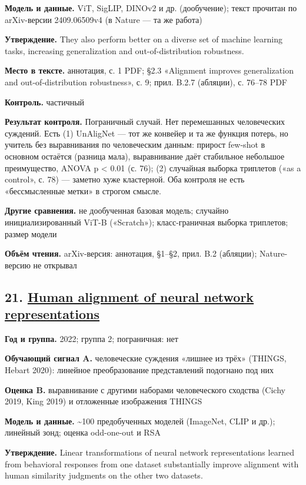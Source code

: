 \textbf{Модель и данные.} ViT, SigLIP, DINOv2 и др. (дообучение); текст прочитан по arXiv-версии 2409.06509v4 (в Nature — та же работа)

\textbf{Утверждение.} They also perform better on a diverse set of machine learning tasks, increasing generalization and out-of-distribution robustness.

\textbf{Место в тексте.} аннотация, с. 1 PDF; §2.3 «Alignment improves generalization and out-of-distribution robustness», с. 9; прил. B.2.7 (абляции), с. 76–78 PDF

\textbf{Контроль.} частичный

\textbf{Результат контроля.} Пограничный случай. Нет перемешанных человеческих суждений. Есть (1) UnAligNet — тот же конвейер и та же функция потерь, но учитель без выравнивания по человеческим данным: прирост few-shot в основном остаётся (разница мала), выравнивание даёт стабильное небольшое преимущество, ANOVA p < 0.01 (с. 76); (2) случайная выборка триплетов («as a control», с. 78) — заметно хуже кластерной. Оба контроля не есть «бессмысленные метки» в строгом смысле.

\textbf{Другие сравнения.} не дообученная базовая модель; случайно инициализированный ViT-B («Scratch»); класс-граничная выборка триплетов; размер модели

\textbf{Объём чтения.} arXiv-версия: аннотация, §1–§2, прил. B.2 (абляции); Nature-версию не открывал


\subsection*{21. \href{https://doi.org/10.48550/arxiv.2211.01201}{Human alignment of neural network representations}}

\textbf{Год и группа.} 2022; группа 2; пограничная: нет

\textbf{Обучающий сигнал A.} человеческие суждения «лишнее из трёх» (THINGS, Hebart 2020): линейное преобразование представлений подогнано под них

\textbf{Оценка B.} выравнивание с другими наборами человеческого сходства (Cichy 2019, King 2019) и отложенные изображения THINGS

\textbf{Модель и данные.} \textasciitilde{}100 предобученных моделей (ImageNet, CLIP и др.); линейный зонд; оценка odd-one-out и RSA

\textbf{Утверждение.} Linear transformations of neural network representations learned from behavioral responses from one dataset substantially improve alignment with human similarity judgments on the other two datasets.

